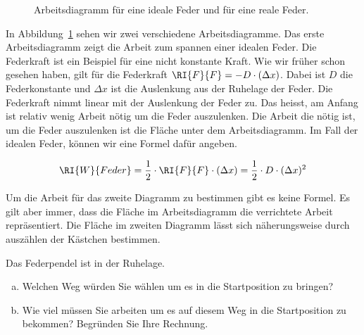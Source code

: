 \documentclass[12pt,a4paper,twoside]{article}
\def\dir{./Aufgaben_Mechanik/}
\newcommand{\Einbinden}[1]{}
\begin{document}
\begin{figure}[h!]
\begin{center}

\end{center}
\caption{\label{fig:arbeitsdiagramm} Arbeitsdiagramm für eine ideale Feder und für eine reale Feder.
}
\end{figure}

In Abbildung~\ref{fig:arbeitsdiagramm} sehen wir zwei verschiedene Arbeitsdiagramme. 
Das erste Arbeitsdiagramm zeigt die Arbeit zum spannen einer idealen Feder.
Die Federkraft ist ein Beispiel für eine nicht konstante Kraft. Wie wir früher schon
gesehen haben, gilt für die Federkraft $\RI{F}{F} = -D\cdot (\Delta x)$. Dabei ist $D$ die Federkonstante
und $\Delta x$ ist die Auslenkung aus der Ruhelage der Feder.
Die Federkraft nimmt linear mit der Auslenkung der Feder zu. Das heisst, am Anfang ist relativ wenig
Arbeit nötig um die Feder auszulenken. Die Arbeit die nötig ist, um die Feder auszulenken ist
die Fläche unter dem Arbeitsdiagramm. Im Fall der idealen Feder, können wir eine Formel dafür angeben.


\begin{eqnarray*}
	\RI{W}{Feder}= \frac{1}{2}\cdot\RI{F}{F}\cdot(\Delta x)=\frac{1}{2}\cdot D\cdot(\Delta x)^2
\end{eqnarray*}

Um die Arbeit für das zweite Diagramm zu bestimmen gibt es keine Formel. Es gilt aber immer, dass die Fläche
im Arbeitsdiagramm die verrichtete Arbeit repräsentiert. Die Fläche im zweiten Diagramm lässt sich näherungsweise
durch auszählen der Kästchen bestimmen.

%

\Einbinden{\dir/arbeit_feder01.tex}


\begin{aufgabe}
	Das Federpendel ist in der Ruhelage.
	\begin{enumerate}[a)]
		\item	Welchen Weg würden Sie wählen um es in die Startposition zu bringen?
		\item	Wie viel müssen Sie arbeiten um es auf diesem Weg in die Startposition zu bekommen? Begründen Sie Ihre Rechnung.
	\end{enumerate}
\end{aufgabe}
\end{document}
